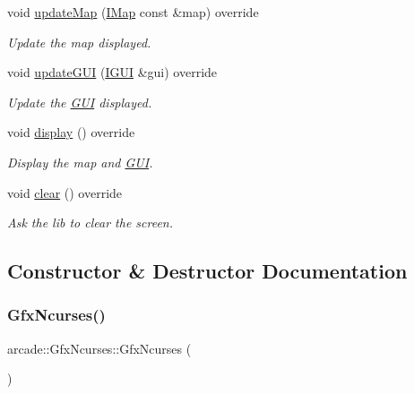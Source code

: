 \begin{DoxyCompactItemize}
$$void \hyperlink{classarcade_1_1_gfx_ncurses_a4e02400d983845ebe37f374f3dd82793}{update\+Map} (\hyperlink{classarcade_1_1_i_map}{I\+Map} const \&map) override
\begin{DoxyCompactList}\small\item\em Update the map displayed. \end{DoxyCompactList}\item 
void \hyperlink{classarcade_1_1_gfx_ncurses_a00469b26c23ff57efdbb2f99dedbbb11}{update\+G\+UI} (\hyperlink{classarcade_1_1_i_g_u_i}{I\+G\+UI} \&gui) override
\begin{DoxyCompactList}\small\item\em Update the \hyperlink{classarcade_1_1_g_u_i}{G\+UI} displayed. \end{DoxyCompactList}\item 
void \hyperlink{classarcade_1_1_gfx_ncurses_aa119cdff68869bcd3829bb9fa9eaa373}{display} () override
\begin{DoxyCompactList}\small\item\em Display the map and \hyperlink{classarcade_1_1_g_u_i}{G\+UI}. \end{DoxyCompactList}\item 
void \hyperlink{classarcade_1_1_gfx_ncurses_aaf443541674ace2e915e393156adf232}{clear} () override
\begin{DoxyCompactList}\small\item\em Ask the lib to clear the screen. \end{DoxyCompactList}\end{DoxyCompactItemize}


\subsection{Constructor \& Destructor Documentation}
\mbox{\label{classarcade_1_1_gfx_ncurses_a0408b1bf8ad9b35de30d82fe2c0512f2}} 
\subsubsection{\texorpdfstring{Gfx\+Ncurses()}{GfxNcurses()}}
{\footnotesize\ttfamily arcade\+::\+Gfx\+Ncurses\+::\+Gfx\+Ncurses (\begin{DoxyParamCaption}{ }\end{DoxyParamCaption})}

